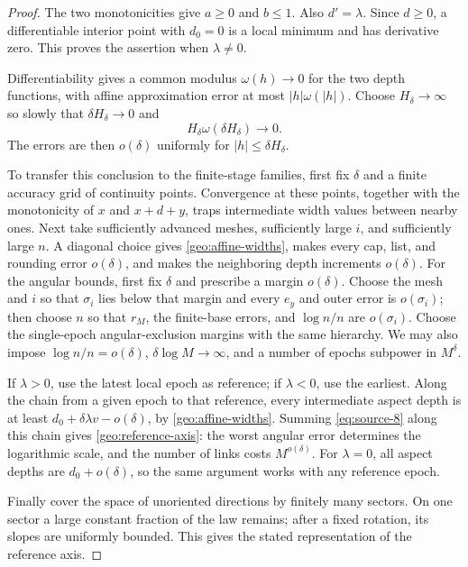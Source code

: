 \begin{proof}
The two monotonicities give \(a\ge0\) and \(b\le1\).
Also \(d'=\lambda\).  Since \(d\ge0\), a differentiable
interior point with \(d_0=0\) is a local minimum and
has derivative zero.  This proves the assertion
when \(\lambda\ne0\).

Differentiability gives a common modulus
\(\omega(h)\to0\) for the two depth functions, with
affine approximation error at most
\(|h|\omega(|h|)\).  Choose \(H_\delta\to\infty\)
so slowly that \(\delta H_\delta\to0\) and
\[
H_\delta\omega(\delta H_\delta)\to0.
\]
The errors are then \(o(\delta)\) uniformly for
\(|h|\le\delta H_\delta\).

To transfer this conclusion to the finite-stage
families, first fix \(\delta\) and a finite accuracy
grid of continuity points.  Convergence at these
points, together with the monotonicity of \(x\)
and \(x+d+y\), traps intermediate width values
between nearby ones.  Next take sufficiently
advanced meshes, sufficiently large \(i\), and
sufficiently large \(n\).  A diagonal choice gives
\eqref{geo:affine-widths}, makes every cap, list,
and rounding error \(o(\delta)\), and makes the
neighboring depth increments \(o(\delta)\).  For the angular
bounds, first fix \(\delta\) and prescribe a margin \(o(\delta)\).
Choose the mesh and \(i\) so that \(\sigma_i\) lies below that
margin and every \(e_y\) and outer error is \(o(\sigma_i)\); then
choose \(n\) so that \(r_M\), the finite-base errors, and
\(\log n/n\) are \(o(\sigma_i)\).  Choose the single-epoch
angular-exclusion margins with the same hierarchy.
We may also impose
\(\log n/n=o(\delta)\),
\(\delta\log M\to\infty\), and a number of epochs
subpower in \(M^\delta\).

If \(\lambda>0\), use the latest local epoch as
reference; if \(\lambda<0\), use the earliest.
Along the chain from a given epoch to that
reference, every intermediate aspect depth is
at least \(d_0+\delta\lambda v-o(\delta)\),
by \eqref{geo:affine-widths}.  Summing
\eqref{eq:source-8} along this chain gives
\eqref{geo:reference-axis}: the worst angular
error determines the logarithmic scale, and the
number of links costs \(M^{o(\delta)}\).
For \(\lambda=0\), all aspect depths are
\(d_0+o(\delta)\), so the same argument works
with any reference epoch.

Finally cover the space of unoriented directions
by finitely many sectors.  On one sector a large
constant fraction of the law remains; after a
fixed rotation, its slopes are uniformly bounded.
This gives the stated representation of the
reference axis.
\end{proof}

